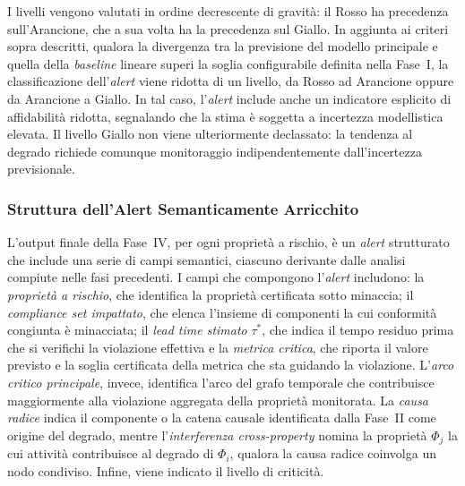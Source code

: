 I livelli vengono valutati in ordine decrescente di gravità: il Rosso ha precedenza sull'Arancione,
che a sua volta ha la precedenza sul Giallo. In aggiunta ai criteri sopra descritti, qualora la divergenza tra la
previsione del modello principale e quella della \textit{baseline} lineare superi la soglia configurabile 
definita nella Fase~I, la classificazione dell'\textit{alert} viene ridotta di un livello, da Rosso ad Arancione
oppure da Arancione a Giallo. In tal caso, l'\textit{alert} include anche un indicatore esplicito di affidabilità ridotta, 
segnalando che la stima è soggetta a incertezza modellistica elevata. Il livello Giallo non viene ulteriormente
declassato: la tendenza al degrado richiede comunque monitoraggio indipendentemente dall'incertezza previsionale.

\subsubsection{Struttura dell'Alert Semanticamente Arricchito}
\label{sec:struttura_alert}

L'output finale della Fase~IV, per ogni proprietà a rischio, è un \textit{alert} strutturato che
include una serie di campi semantici, ciascuno derivante dalle analisi compiute nelle fasi
precedenti. I campi che compongono l'\textit{alert} includono: la \textit{proprietà a rischio}, che
identifica la proprietà certificata sotto minaccia; il \textit{compliance set impattato}, che elenca
l'insieme di componenti la cui conformità congiunta è minacciata; il \textit{lead time stimato}
$\tau^*$, che indica il tempo residuo prima che si verifichi la violazione effettiva e la
\textit{metrica critica}, che riporta il valore previsto e la soglia certificata della metrica che
sta guidando la violazione. L'\textit{arco critico principale}, invece, identifica l'arco del grafo
temporale che contribuisce maggiormente alla violazione aggregata della proprietà monitorata. 
La \textit{causa radice} indica il componente o la catena causale identificata dalla Fase~II come origine 
del degrado, mentre l'\textit{interferenza cross-property} nomina la proprietà $\Phi_j$ la cui attività 
contribuisce al degrado di $\Phi_i$, qualora la causa radice coinvolga un nodo condiviso. Infine, 
viene indicato il livello di criticità.

